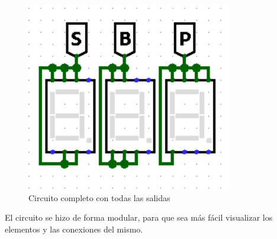 \begin{figure}[H]
    \centering
    \includegraphics[width=0.8\textwidth]{Salidas.png}
    \caption{Circuito completo con todas las salidas}
\end{figure}

El circuito se hizo de forma modular, para que sea más fácil visualizar los elementos y las conexiones del mismo.


\newpage